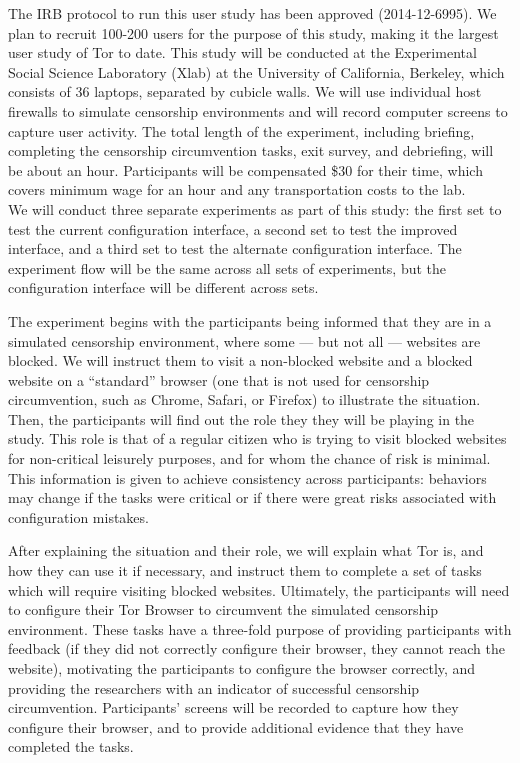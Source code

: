 \documentclass{template}
\begin{document}
The IRB protocol to run this user study has been approved (2014-12-6995). 
We plan to recruit 100-200 users for the purpose of this study,
making it the largest user study of Tor to date.  This study will be conducted at the
Experimental Social Science Laboratory (Xlab)
at the University of California, Berkeley, which consists of 36 laptops,
separated by cubicle walls. We will use individual host firewalls to simulate
censorship environments and will record computer screens to capture 
user activity. The total length of the experiment, including briefing, completing the censorship 
circumvention tasks, exit survey, and debriefing, will be about an hour.
Participants will be compensated \$30 for their time, which covers
minimum wage for an hour and any transportation costs to the lab.  \\

We will conduct three separate experiments as part of this study:
the first set to test the current configuration
interface, a second set to test the improved interface, and a third set to test the 
alternate configuration interface. The experiment flow will be the same across all 
sets of experiments, but the configuration interface will be different across sets. 

The experiment begins with the participants being informed that they are in a
simulated censorship
environment, where some --- but not all --- websites are blocked. We will
instruct them to visit a non-blocked website and a blocked website on a
``standard'' browser (one that is not used for censorship circumvention, such
as Chrome, Safari, or Firefox) to illustrate the situation.
Then, the participants will find out the role they they will be playing in the study.
This role is that of a regular citizen who is trying to visit blocked websites
for non-critical leisurely purposes,
and for whom the chance of risk is minimal. This information is given
to achieve
consistency across participants: behaviors may change if the tasks were 
critical or if there were great risks associated with configuration mistakes. 

After explaining the situation and their role, we will explain what Tor is, and
how they can use it if necessary, and instruct them to complete a set of
tasks which will require visiting blocked websites. Ultimately, the
participants will need to configure their Tor Browser to circumvent the
simulated censorship environment. These tasks have a three-fold purpose of
providing participants with feedback (if they did not correctly configure their
browser, they cannot reach the website),  motivating the participants to
configure the browser correctly, and providing the researchers with an
indicator of successful censorship circumvention.
Participants' screens will be recorded to capture how they configure
their browser, and to provide additional evidence that they have completed the
tasks.
\end{document}
